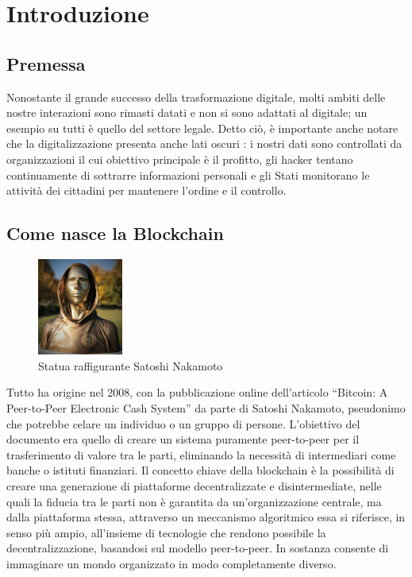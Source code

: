 \chapter{Introduzione}
\section{Premessa}
Nonostante il grande successo della trasformazione digitale, molti ambiti delle nostre interazioni sono rimasti datati e non si sono adattati al digitale; un esempio su tutti è quello del settore legale. Detto ciò, è importante anche notare che la digitalizzazione presenta anche lati oscuri \cite{La_quarta_rivoluzione_industriale}: i nostri dati sono controllati da organizzazioni il cui obiettivo principale è il profitto, gli hacker tentano continuamente di sottrarre informazioni personali e gli Stati monitorano le attività dei cittadini per mantenere l’ordine e il controllo.

\section{Come nasce la Blockchain}
\begin{figure} %
    \centering
    \includegraphics[width=0.25\textwidth]{Immagini/Satoshi_Nakamoto.jpg}
    \caption{Statua raffigurante Satoshi Nakamoto}
\end{figure}
Tutto ha origine nel 2008, con la pubblicazione online dell’articolo “Bitcoin: A Peer-to-Peer Electronic Cash System” da parte di Satoshi Nakamoto, pseudonimo che potrebbe celare un individuo o un gruppo di persone. L’obiettivo del documento era quello di creare un sistema puramente peer-to-peer per il trasferimento di valore tra le parti, eliminando la necessità di intermediari come banche o istituti finanziari.
Il concetto chiave della blockchain è la possibilità di creare una generazione di piattaforme decentralizzate e disintermediate, nelle quali la fiducia tra le parti non è garantita da un’organizzazione centrale, ma dalla piattaforma stessa, attraverso un meccanismo algoritmico essa si riferisce, in senso più ampio, all’insieme di tecnologie che rendono possibile la decentralizzazione, basandosi sul modello peer-to-peer.
In sostanza consente di immaginare un mondo organizzato in modo completamente diverso.
